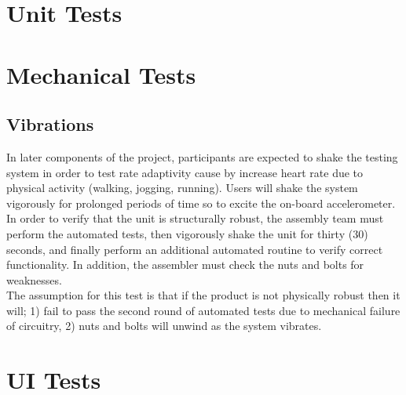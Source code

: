\documentclass[]{article}
\begin{document}
\section{Unit Tests}

\section{Mechanical Tests}\label{sec:mech_test}
\subsection{Vibrations}
In later components of the project, participants are expected to shake the testing system in order to test rate adaptivity cause by increase heart rate due to physical activity (walking, jogging, running). Users will shake the system vigorously for prolonged periods of time so to excite the on-board accelerometer.\\

In order to verify that the unit is structurally robust, the assembly team must perform the automated tests, then vigorously shake the unit for thirty (30) seconds, and finally perform an additional automated routine to verify correct functionality. In addition, the assembler must check the nuts and bolts for weaknesses. \\

The assumption for this test is that if the product is not physically robust then it will; 1) fail to pass the second round of automated tests due to mechanical failure of circuitry, 2) nuts and bolts will unwind as the system vibrates. 

\section{UI Tests}
\end{document}
